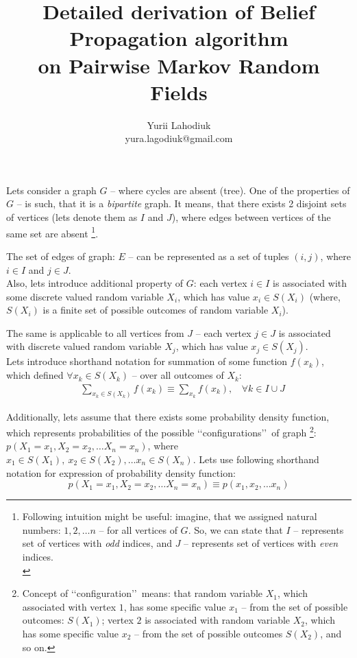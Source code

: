 \documentclass[fleqn,leqno]{article}
\begin{document}
\title{Detailed derivation of Belief Propagation algorithm \\ on Pairwise Markov Random Fields}
\author{Yurii Lahodiuk \\ yura.lagodiuk@gmail.com}
\date{}
\maketitle

Lets consider a graph $G$ -- where cycles are absent (tree). One of the properties of $G$ -- is such, that it is a \emph{bipartite} graph. It means, that there exists 2 disjoint sets of vertices (lets denote them as $I$ and $J$), where edges between vertices of the same set are absent \footnote{Following intuition might be useful: imagine, that we assigned natural numbers: $1, 2, \dots n$ -- for all vertices of $G$. So, we can state that $I$ -- represents set of vertices with \emph{odd} indices, and $J$ -- represents set of vertices with \emph{even} indices.\\}.

The set of edges of graph: $E$ -- can be represented as a set of tuples $(i, j)$, where $i \in I$ and $j \in J$.\\

Also, lets introduce additional property of $G$: each vertex $i \in I$ is associated with some discrete valued random variable $X_i$, which has value $x_i \in S(X_i)$ (where, $S(X_i)$ is a finite set of possible outcomes of random variable $X_i$). 

The same is applicable to all vertices from $J$ -- each vertex $j \in J$ is associated with discrete valued random variable $X_j$, which has value $x_j \in S(X_j)$. \\

Lets introduce shorthand notation for summation of some function $f(x_k)$, which defined $\forall x_k \in S(X_k)$ -- over all outcomes of $X_k$:
\begin{equation}
\begin{split}
   & \sum_{x_k \in S(X_k)} f(x_k) \equiv \sum_{x_k} f(x_k), \ \ \ \ \forall k \in I \cup J
\end{split}
\end{equation}

Additionally, lets assume that there exists some probability density function, which represents probabilities of the possible \lq \lq configurations\rq \rq\ of graph \footnote{Concept of \lq \lq configuration\rq \rq\ means: that random variable $X_1$, which associated with vertex $1$, has some specific value $x_1$ -- from the set of possible outcomes: $S(X_1)$; vertex $2$ is associated with random variable $X_2$, which has some specific value $x_2$ -- from the set of possible outcomes $S(X_2)$, and so on.}: $p(X_1=x_1, X_2=x_2, \dots X_n=x_n)$, where $x_1 \in S(X_1),\ x_2 \in S(X_2),\dots x_n \in S(X_n)$. Lets use following shorthand notation for expression of probability density function:
\begin{equation}
   p(X_1=x_1, X_2=x_2, \dots X_n=x_n) \equiv p(x_1, x_2, \dots x_n)
\end{equation}
\end{document}
